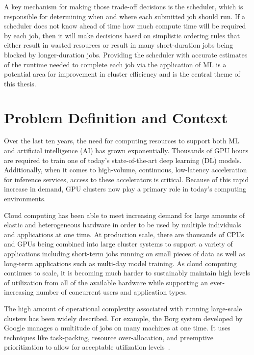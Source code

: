 \clearpage
A key mechanism for making those trade-off decisions is the scheduler, which is responsible for determining when and where each submitted job should run. If a scheduler does not know ahead of time how much compute time will be required by each job, then it will make decisions based on simplistic ordering rules that either result in wasted resources or result in many short-duration jobs being blocked by longer-duration jobs. Providing the scheduler with accurate estimates of the runtime needed to complete each job via the application of ML is a potential area for improvement in cluster efficiency and is the central theme of this thesis.

\section{Problem Definition and Context}

Over the last ten years, the need for computing resources to support both ML and artificial intelligence (AI) has grown exponentially. Thousands of GPU hours are required to train one of today's state-of-the-art deep learning (DL) models. Additionally, when it comes to high-volume, continuous, low-latency acceleration for inference services, access to these accelerators is critical. Because of this rapid increase in demand, GPU clusters now play a primary role in today's computing environments.

Cloud computing has been able to meet increasing demand for large amounts of elastic and heterogeneous hardware in order to be used by multiple individuals and applications at one time. At production scale, there are thousands of CPUs and GPUs being combined into large cluster systems to support a variety of applications including short-term jobs running on small pieces of data as well as long-term applications such as multi-day model training. As cloud computing continues to scale, it is becoming much harder to sustainably maintain high levels of utilization from all of the available hardware while supporting an ever-increasing number of concurrent users and application types.

The high amount of operational complexity associated with running large-scale clusters has been widely described. For example, the Borg system developed by Google manages a multitude of jobs on many machines at one time. It uses techniques like task-packing, resource over-allocation, and preemptive prioritization to allow for acceptable utilization levels~\cite{verma2015large}.

